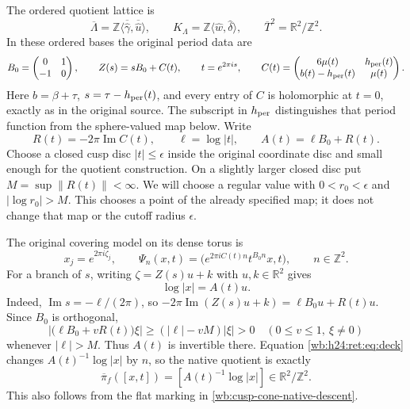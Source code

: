The ordered quotient lattice is
\[
 \overline\Lambda=\mathbb Z\langle\overline{\widehat\gamma},
              \overline{\widehat u}\rangle,
 \qquad
 K_\Lambda=\mathbb Z\langle\widehat w,\widehat\delta\rangle,
 \qquad
 \overline T^2=\mathbb R^2/\mathbb Z^2.
\]
In these ordered bases the original period data are
\begin{equation}
 B_0=\begin{pmatrix}0&1\\-1&0\end{pmatrix},\qquad
 Z(s)=sB_0+C(t),\qquad t=e^{2\pi i s},\qquad
 C(t)=\begin{pmatrix}6\mu(t)&h_{\rm per}(t)\\
 b(t)-h_{\rm per}(t)&\mu(t)\end{pmatrix}.
 \label{wb:h24:ret:eq:original-periods}
\end{equation}
Here \(b=\beta+\tau\), \(s=\tau-h_{\rm per}(t)\), and every entry of
\(C\) is holomorphic at \(t=0\), exactly as in the original source.
The subscript in \(h_{\rm per}\) distinguishes that period function
from the sphere-valued map below.  Write
\begin{equation}
 R(t)=-2\pi\operatorname{Im}C(t),\qquad
 \ell=\log|t|,\qquad A(t)=\ell B_0+R(t).
 \label{wb:h24:ret:eq:A}
\end{equation}
Choose a closed cusp disc \(|t|\leq\epsilon\) inside the original
coordinate disc and small enough for the quotient construction.  On a
slightly larger closed disc put \(M=\sup\|R(t)\|<\infty\).  We will
choose a regular value with \(0<r_0<\epsilon\) and
\(|\log r_0|>M\).  This chooses a point of the already specified map;
it does not change that map or the cutoff radius \(\epsilon\).

The original covering model on its dense torus is
\begin{equation}
 x_j=e^{2\pi i\zeta_j},\qquad
 \Psi_n(x,t)=
 \bigl(e^{2\pi i C(t)n}t^{B_0n}x,t\bigr),\qquad n\in\mathbb Z^2.
 \label{wb:h24:ret:eq:deck}
\end{equation}
For a branch of \(s\), writing
\(\zeta=Z(s)u+k\) with \(u,k\in\mathbb R^2\) gives
\begin{equation}
 \log|x|=A(t)u.
 \label{wb:h24:ret:eq:logx}
\end{equation}
Indeed, \(\operatorname{Im}s=-\ell/(2\pi)\), so
\(-2\pi\operatorname{Im}(Z(s)u+k)=\ell B_0u+R(t)u\).
Since \(B_0\) is orthogonal,
\begin{equation}
 \bigl|\bigl(\ell B_0+vR(t)\bigr)\xi\bigr|
 \geq (|\ell|-vM)|\xi|>0
 \quad(0\leq v\leq1,\ \xi\ne0)
 \label{wb:h24:ret:eq:invertibility}
\end{equation}
whenever \(|\ell|>M\).  Thus \(A(t)\) is invertible there.  Equation
\eqref{wb:h24:ret:eq:deck} changes \(A(t)^{-1}\log|x|\) by \(n\), so the native
quotient is exactly
\begin{equation}
 \overline\pi_f([x,t])=[A(t)^{-1}\log|x|]\in\mathbb R^2/\mathbb Z^2.
 \label{wb:h24:ret:eq:native}
\end{equation}
This also follows from the flat marking in \cref{wb:cusp-cone-native-descent}.

